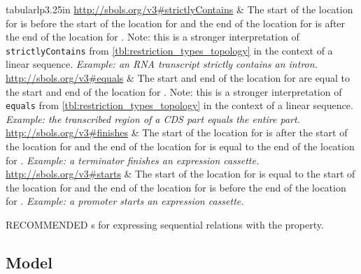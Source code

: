 \begin{table}[ht]
\begin{edtable}{tabular}{lp{3.25in}}
	\url{http://sbols.org/v3#strictlyContains} &	The start of the location for  is before the start of the location for  and the end of the location for  is after the end of the location for . 
	Note: this is a stronger interpretation of {\tt strictlyContains} from \ref{tbl:restriction_types_topology} in the context of a linear sequence.
	\emph{Example: an RNA transcript strictly contains an intron.} \\
	
	\url{http://sbols.org/v3#equals} &	The start and end of the location for  are equal to the start and end of the location for . 
	Note: this is a stronger interpretation of {\tt equals} from \ref{tbl:restriction_types_topology} in the context of a linear sequence.
	\emph{Example: the transcribed region of a CDS part equals the entire part.} \\
	
	\url{http://sbols.org/v3#finishes} &	The start of the location for  is after the start of the location for  and the end of the location for  is equal to the end of the location for . 
	\emph{Example: a terminator finishes an expression cassette.} \\
	
	\url{http://sbols.org/v3#starts} &	The start of the location for  is equal to the start of the location for  and the end of the location for  is before the end of the location for . 
	\emph{Example: a promoter starts an expression cassette.} \\
    \bottomrule
  \end{edtable}
  \caption{RECOMMENDED s for expressing sequential relations with the  property.}
  \label{tbl:restriction_types_sequence}
\end{table}



\subsection{Model}
\label{sec:Model}

